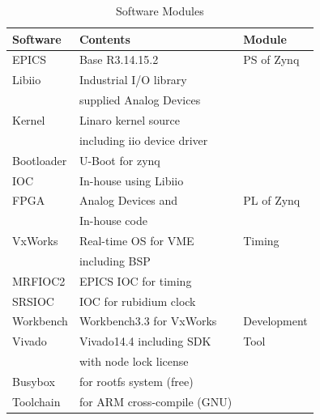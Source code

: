 \documentclass[journal]{IEEEtran}
\begin{document}
\begin{table}[h!t]
\centering
\caption{Software Modules}
	\label{sw-conf}
	
	\begin{tabular}{@{}lll@{}}
		
		\hline
		\textbf{Software} & \textbf{Contents}                 & \textbf{Module}     \\
		\hline
		EPICS        & Base R3.14.15.2                       & PS of Zynq            \\
		Libiio       & Industrial I/O library                &                       \\
		& supplied Analog Devices               &                       \\         
		Kernel       & Linaro kernel source                  &                       \\
		& including iio device driver           &                       \\         
		Bootloader   & U-Boot for zynq                       &                       \\
		IOC          & In-house using Libiio                 &                       \\
		
		\hline
		FPGA         & Analog Devices and                    & PL of Zynq            \\
		& In-house code                         &                       \\
		
		\hline
		VxWorks      & Real-time OS for VME                  & Timing                \\
		& including BSP                         &                       \\         
		MRFIOC2      & EPICS IOC for timing                  &                       \\
		
		\hline
		SRSIOC       & IOC for rubidium clock                &                       \\
		
		\hline
		Workbench    & Workbench3.3 for VxWorks              & Development           \\
		Vivado       & Vivado14.4 including SDK              & Tool                  \\        
		& with node lock license                &                       \\            
		Busybox      & for rootfs system (free)              &                       \\
		Toolchain    & for ARM cross-compile (GNU)           &                       \\        
		\hline
		
	\end{tabular}
\end{table}
\end{document}
